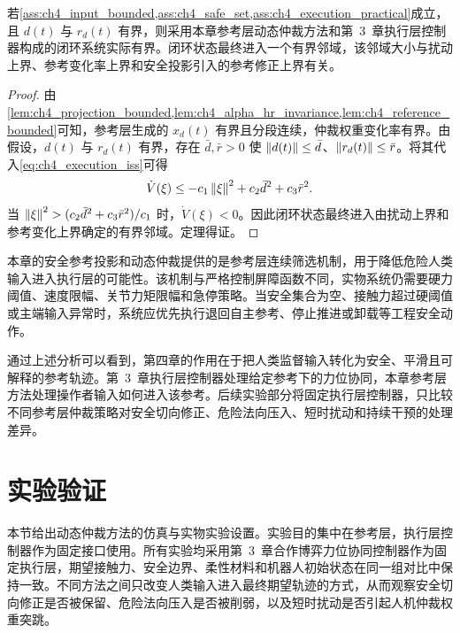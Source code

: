 \begin{theorem}[有界参考下的闭环实际有界性]
\label{thm:ch4_closed_loop_bounded}
若\cref{ass:ch4_input_bounded,ass:ch4_safe_set,ass:ch4_execution_practical}成立，且 $d(t)$ 与 $r_d(t)$ 有界，则采用本章参考层动态仲裁方法和第~3~章执行层控制器构成的闭环系统实际有界。闭环状态最终进入一个有界邻域，该邻域大小与扰动上界、参考变化率上界和安全投影引入的参考修正上界有关。
\end{theorem}

\begin{proof}
由\cref{lem:ch4_projection_bounded,lem:ch4_alpha_hr_invariance,lem:ch4_reference_bounded}可知，参考层生成的 $x_d(t)$ 有界且分段连续，仲裁权重变化率有界。由假设，$d(t)$ 与 $r_d(t)$ 有界，存在 $\bar d,\bar r>0$ 使 $\left\lVert d(t)\right\rVert\le\bar d$、$\left\lVert r_d(t)\right\rVert\le\bar r$。将其代入\eqref{eq:ch4_execution_iss}可得
\begin{equation}
  \dot V(\xi)
  \le
  -c_1\left\lVert \xi\right\rVert^2
  +c_2\bar d^2+c_3\bar r^2 .
  \label{eq:ch4_practical_bound}
\end{equation}
当 $\left\lVert \xi\right\rVert^2>(c_2\bar d^2+c_3\bar r^2)/c_1$ 时，$\dot V(\xi)<0$。因此闭环状态最终进入由扰动上界和参考变化上界确定的有界邻域。定理得证。
\end{proof}

\begin{remark}[工程安全边界]
\label{rem:ch4_engineering_safety}
本章的安全参考投影和动态仲裁提供的是参考层连续筛选机制，用于降低危险人类输入进入执行层的可能性。该机制与严格控制屏障函数不同，实物系统仍需要硬力阈值、速度限幅、关节力矩限幅和急停策略。当安全集合为空、接触力超过硬阈值或主端输入异常时，系统应优先执行退回自主参考、停止推进或卸载等工程安全动作。
\end{remark}

通过上述分析可以看到，第四章的作用在于把人类监督输入转化为安全、平滑且可解释的参考轨迹。第~3~章执行层控制器处理给定参考下的力位协同，本章参考层方法处理操作者输入如何进入该参考。后续实验部分将固定执行层控制器，只比较不同参考层仲裁策略对安全切向修正、危险法向压入、短时扰动和持续干预的处理差异。

\section{实验验证}
\label{sec:ch4_experiment}

本节给出动态仲裁方法的仿真与实物实验设置。实验目的集中在参考层，执行层控制器作为固定接口使用。所有实验均采用第~3~章合作博弈力位协同控制器作为固定执行层，期望接触力、安全边界、柔性材料和机器人初始状态在同一组对比中保持一致。不同方法之间只改变人类输入进入最终期望轨迹的方式，从而观察安全切向修正是否被保留、危险法向压入是否被削弱，以及短时扰动是否引起人机仲裁权重突跳。

